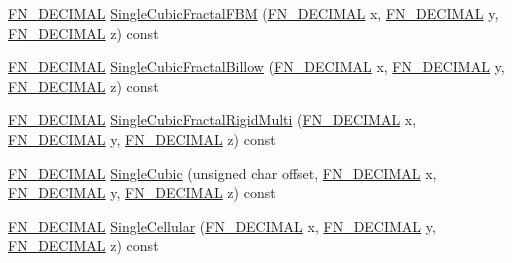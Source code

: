 \begin{DoxyCompactItemize}
\item 
\mbox{\hyperlink{_fast_noise_8h_a75a9ef6d2541c4921815b885bfd449c3}{F\+N\+\_\+\+D\+E\+C\+I\+M\+AL}} \mbox{\hyperlink{class_fast_noise_a6334e559478fb891e31e305d64c0c31d}{Single\+Cubic\+Fractal\+F\+BM}} (\mbox{\hyperlink{_fast_noise_8h_a75a9ef6d2541c4921815b885bfd449c3}{F\+N\+\_\+\+D\+E\+C\+I\+M\+AL}} x, \mbox{\hyperlink{_fast_noise_8h_a75a9ef6d2541c4921815b885bfd449c3}{F\+N\+\_\+\+D\+E\+C\+I\+M\+AL}} y, \mbox{\hyperlink{_fast_noise_8h_a75a9ef6d2541c4921815b885bfd449c3}{F\+N\+\_\+\+D\+E\+C\+I\+M\+AL}} z) const
\item 
\mbox{\hyperlink{_fast_noise_8h_a75a9ef6d2541c4921815b885bfd449c3}{F\+N\+\_\+\+D\+E\+C\+I\+M\+AL}} \mbox{\hyperlink{class_fast_noise_a8595f37169b6133ccd822d21af3acd60}{Single\+Cubic\+Fractal\+Billow}} (\mbox{\hyperlink{_fast_noise_8h_a75a9ef6d2541c4921815b885bfd449c3}{F\+N\+\_\+\+D\+E\+C\+I\+M\+AL}} x, \mbox{\hyperlink{_fast_noise_8h_a75a9ef6d2541c4921815b885bfd449c3}{F\+N\+\_\+\+D\+E\+C\+I\+M\+AL}} y, \mbox{\hyperlink{_fast_noise_8h_a75a9ef6d2541c4921815b885bfd449c3}{F\+N\+\_\+\+D\+E\+C\+I\+M\+AL}} z) const
\item 
\mbox{\hyperlink{_fast_noise_8h_a75a9ef6d2541c4921815b885bfd449c3}{F\+N\+\_\+\+D\+E\+C\+I\+M\+AL}} \mbox{\hyperlink{class_fast_noise_ab460847f52a3b64ac6ebbda5538c9c9a}{Single\+Cubic\+Fractal\+Rigid\+Multi}} (\mbox{\hyperlink{_fast_noise_8h_a75a9ef6d2541c4921815b885bfd449c3}{F\+N\+\_\+\+D\+E\+C\+I\+M\+AL}} x, \mbox{\hyperlink{_fast_noise_8h_a75a9ef6d2541c4921815b885bfd449c3}{F\+N\+\_\+\+D\+E\+C\+I\+M\+AL}} y, \mbox{\hyperlink{_fast_noise_8h_a75a9ef6d2541c4921815b885bfd449c3}{F\+N\+\_\+\+D\+E\+C\+I\+M\+AL}} z) const
\item 
\mbox{\hyperlink{_fast_noise_8h_a75a9ef6d2541c4921815b885bfd449c3}{F\+N\+\_\+\+D\+E\+C\+I\+M\+AL}} \mbox{\hyperlink{class_fast_noise_a916d50d82702accf7842f5376619560e}{Single\+Cubic}} (unsigned char offset, \mbox{\hyperlink{_fast_noise_8h_a75a9ef6d2541c4921815b885bfd449c3}{F\+N\+\_\+\+D\+E\+C\+I\+M\+AL}} x, \mbox{\hyperlink{_fast_noise_8h_a75a9ef6d2541c4921815b885bfd449c3}{F\+N\+\_\+\+D\+E\+C\+I\+M\+AL}} y, \mbox{\hyperlink{_fast_noise_8h_a75a9ef6d2541c4921815b885bfd449c3}{F\+N\+\_\+\+D\+E\+C\+I\+M\+AL}} z) const
\item 
\mbox{\hyperlink{_fast_noise_8h_a75a9ef6d2541c4921815b885bfd449c3}{F\+N\+\_\+\+D\+E\+C\+I\+M\+AL}} \mbox{\hyperlink{class_fast_noise_a0d55ad41a81a37df679a5ed92cef2d36}{Single\+Cellular}} (\mbox{\hyperlink{_fast_noise_8h_a75a9ef6d2541c4921815b885bfd449c3}{F\+N\+\_\+\+D\+E\+C\+I\+M\+AL}} x, \mbox{\hyperlink{_fast_noise_8h_a75a9ef6d2541c4921815b885bfd449c3}{F\+N\+\_\+\+D\+E\+C\+I\+M\+AL}} y, \mbox{\hyperlink{_fast_noise_8h_a75a9ef6d2541c4921815b885bfd449c3}{F\+N\+\_\+\+D\+E\+C\+I\+M\+AL}} z) const

\end{DoxyCompactItemize}
